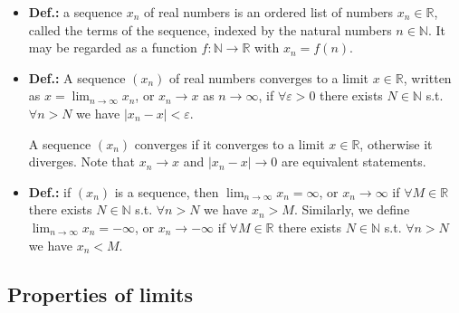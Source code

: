 \documentclass{article}
\begin{document}
\begin{itemize}
\item \textbf{Def.:} a sequence $x_n$ of real numbers is an ordered list of numbers $x_n \in \mathbb{R}$, called the terms of the sequence, indexed by the natural numbers $n \in \mathbb{N}$. It may be regarded as a function $f: \mathbb{N} \to \mathbb{R}$ with $x_n = f(n)$.

\item \textbf{Def.:} A sequence $(x_n)$ of real numbers converges to a limit $x \in \mathbb{R}$, written as $\displaystyle x = \lim_{n\to\infty} x_n$, or $x_n \to x$ as $n\to\infty$, if $\forall \varepsilon > 0$ there exists $N \in \mathbb{N}$ s.t. $\forall n > N$ we have $|x_n - x| < \varepsilon$.

A sequence $(x_n)$ converges if it converges to a limit $x \in \mathbb{R}$, otherwise it diverges. Note that $x_n \to x$ and $|x_n - x| \to 0$ are equivalent statements.

\item \textbf{Def.:} if $(x_n)$ is a sequence, then $\displaystyle \lim_{n\to\infty} x_n = \infty$, or $x_n\to\infty$ if $\forall M \in \mathbb{R}$ there exists $N \in \mathbb{N}$ s.t. $\forall n > N$ we have $x_n > M$. Similarly, we define $\displaystyle \lim_{n\to\infty} x_n = -\infty$, or $x_n \to -\infty$ if $\forall M \in \mathbb{R}$ there exists $N \in \mathbb{N}$ s.t. $\forall n > N$ we have $x_n < M$.
\end{itemize}

\subsection{Properties of limits}
\end{document}
